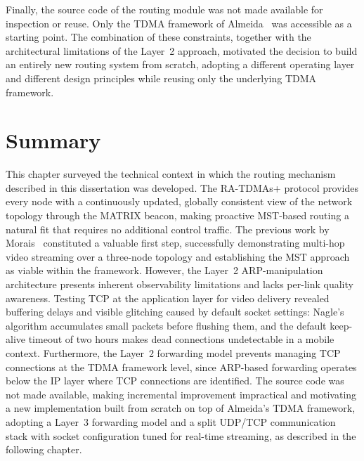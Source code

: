 Finally, the source code of the routing module was not made available for inspection or reuse.
Only the TDMA framework of Almeida~\cite{almeida2023synchronization} was accessible as a
starting point. The combination of these constraints, together with the architectural limitations
of the Layer~2 approach, motivated the decision to build an entirely new routing system from
scratch, adopting a different operating layer and different design principles while reusing only
the underlying TDMA framework.






\section{Summary}
\label{sec:background-summary}

This chapter surveyed the technical context in which the routing mechanism described in this
dissertation was developed. The RA-TDMAs+ protocol provides every node with a
continuously updated, globally consistent view of the network topology through the MATRIX
beacon, making proactive MST-based routing a natural fit that requires no additional control
traffic. The previous work by Morais~\cite{morais2024synchronization} constituted a valuable
first step, successfully demonstrating multi-hop video streaming over a three-node topology
and establishing the MST approach as viable within the framework. However, the Layer~2
ARP-manipulation architecture presents inherent observability limitations and lacks
per-link quality awareness. Testing TCP at the application layer for video delivery
revealed buffering delays and visible glitching caused by default socket settings:
Nagle's algorithm accumulates small packets before flushing them, and the default
keep-alive timeout of two hours makes dead connections undetectable in a mobile
context. Furthermore, the Layer~2 forwarding model prevents managing TCP connections
at the TDMA framework level, since ARP-based forwarding operates below the IP layer
where TCP connections are identified. The source code was not made available,
making incremental improvement impractical and motivating a new implementation built
from scratch on top of Almeida's TDMA framework, adopting a Layer~3 forwarding
model and a split UDP/TCP communication stack with socket configuration tuned
for real-time streaming, as described in the following chapter.
